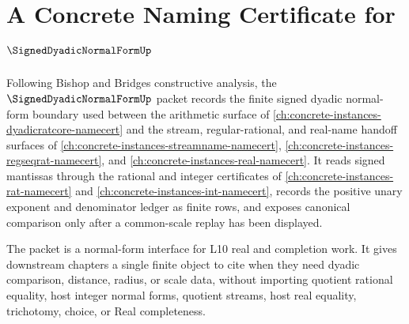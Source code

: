 \chapter{A Concrete Naming Certificate for $\SignedDyadicNormalFormUp$}
\label{ch:concrete-instances-signed-dyadic-normal-form-namecert}

Following Bishop and Bridges constructive analysis, the $\SignedDyadicNormalFormUp$ packet records the finite signed dyadic normal-form boundary used between the arithmetic surface of \autoref{ch:concrete-instances-dyadicratcore-namecert} and the stream, regular-rational, and real-name handoff surfaces of \autoref{ch:concrete-instances-streamname-namecert}, \autoref{ch:concrete-instances-regseqrat-namecert}, and \autoref{ch:concrete-instances-real-namecert}. It reads signed mantissas through the rational and integer certificates of \autoref{ch:concrete-instances-rat-namecert} and \autoref{ch:concrete-instances-int-namecert}, records the positive unary exponent and denominator ledger as finite rows, and exposes canonical comparison only after a common-scale replay has been displayed.

The packet is a normal-form interface for L10 real and completion work. It gives downstream chapters a single finite object to cite when they need dyadic comparison, distance, radius, or scale data, without importing quotient rational equality, host integer normal forms, quotient streams, host real equality, trichotomy, choice, or Real completeness.

